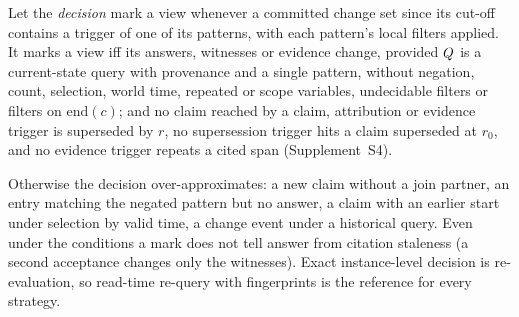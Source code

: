 \begin{proposition}[Exactness]\label{prop:exactness}
Let the \emph{decision} mark a view whenever a committed change set since its cut-off contains a
trigger of one of its patterns, with each pattern's local filters applied. It marks a view iff
its answers, witnesses or evidence change, provided $Q$ is a current-state query with
provenance and a single pattern, without negation, count, selection, world time, repeated or
scope variables, undecidable filters or filters on $\mathrm{end}(c)$; and no claim reached by a
claim, attribution or evidence trigger is superseded by $r$, no supersession trigger hits a claim
superseded at $r_0$, and no evidence trigger repeats a cited span (Supplement~S4).
\end{proposition}

\noindent Otherwise the decision over-approximates: a new claim without a join partner, an entry
matching the negated pattern but no answer, a claim with an earlier start under selection by valid
time, a change event under a historical query. Even under the conditions a mark does not tell answer from citation staleness (a second
acceptance changes only the witnesses). Exact instance-level decision is re-evaluation, so
read-time re-query with fingerprints is the reference for every strategy.

